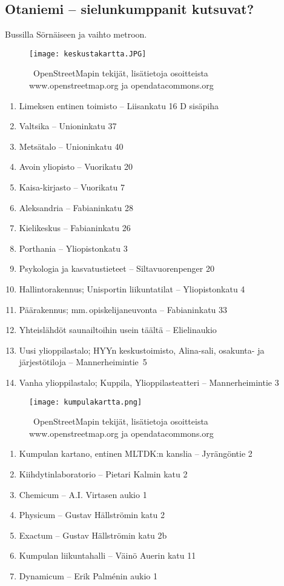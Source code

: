 \documentclass[../ala_hataile.tex]{subfiles}
\begin{document}
\subsection*{Otaniemi -- sielunkumppanit kutsuvat?}
Bussilla Sörnäiseen ja vaihto metroon.
\newpage
\begin{figure*}[!t]
	\centering
	\texttt{[image: keskustakartta.JPG]}
	\caption{\textcopyright~OpenStreetMapin tekijät, lisätietoja osoitteista www.openstreetmap.org ja opendatacommons.org}
\end{figure*}
\begin{enumerate}
\item Limeksen entinen toimisto -- Liisankatu 16 D sisäpiha
\item Valtsika -- Unioninkatu 37
\item Metsätalo -- Unioninkatu 40
\item Avoin yliopisto -- Vuorikatu 20
\item Kaisa-kirjasto -- Vuorikatu 7
\item Aleksandria -- Fabianinkatu 28
\item Kielikeskus -- Fabianinkatu 26
\item Porthania -- Yliopistonkatu 3
\item Psykologia ja kasvatustieteet -- Siltavuorenpenger 20
\item Hallintorakennus; Unisportin liikuntatilat -- Yliopistonkatu 4
\item Päärakennus; mm.\,opiskelijaneuvonta -- Fabianinkatu 33
\item Yhteislähdöt saunailtoihin usein täältä -- Elielinaukio
\item Uusi ylioppilastalo; HYYn keskustoimisto, Alina-sali, osakunta- ja järjestötiloja --  Mannerheimintie~5
\item Vanha ylioppilastalo; Kuppila, Ylioppilasteatteri -- Mannerheimintie 3
\end{enumerate}

\newpage
\begin{figure*}[!t]
	\centering
	\texttt{[image: kumpulakartta.png]}
	\caption{\textcopyright~OpenStreetMapin tekijät, lisätietoja osoitteista www.openstreetmap.org ja opendatacommons.org}
\end{figure*}
\begin{enumerate}
\item Kumpulan kartano, entinen MLTDK:n kanslia -- Jyrängöntie 2
\item Kiihdytinlaboratorio -- Pietari Kalmin katu 2
\item Chemicum -- A.I. Virtasen aukio 1
\item Physicum -- Gustav Hällströmin katu 2
\item Exactum -- Gustav Hällströmin katu 2b
\item Kumpulan liikuntahalli -- Väinö Auerin katu 11
\item Dynamicum -- Erik Palménin aukio 1
\end{enumerate}
\clearpage
\end{document}
